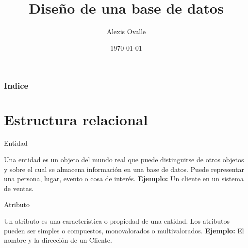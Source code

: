 \documentclass[spanish]{beamer}
\title{Diseño de una base de datos}
\author{Alexis Ovalle}
\date{\today}
\begin{document}
\begin{frame}
    \titlepage
\end{frame}

\begin{frame}
\frametitle{Indice}
\tableofcontents
\end{frame}


\section{Estructura relacional}
\begin{frame}{Entidad}
    \begin{tcolorbox}[title=Entidad,colback=blue!5!white,colframe=blue!75!black]
        Una entidad es un objeto del mundo real que puede distinguirse de otros objetos y sobre el cual se almacena información en una base de datos. 
        Puede representar una persona, lugar, evento o cosa de interés. 
        \textbf{Ejemplo:} Un cliente en un sistema de ventas.
    \end{tcolorbox}
\end{frame}

\begin{frame}{Atributo}
    \begin{tcolorbox}[title=Atributo,colback=green!5!white,colframe=green!75!black]
        Un atributo es una característica o propiedad de una entidad. 
        Los atributos pueden ser simples o compuestos, monovalorados o multivalorados.
        \textbf{Ejemplo:} El nombre y la dirección de un Cliente.
    \end{tcolorbox}
\end{frame}
\end{document}
